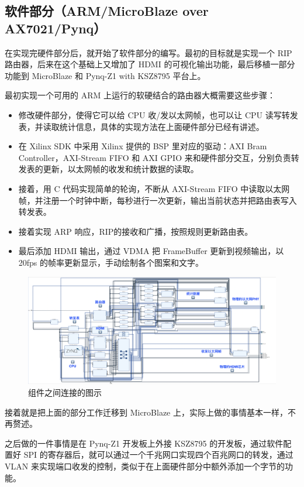 \documentclass{ctexart}
\begin{document}
\subsection{软件部分（ARM/MicroBlaze over AX7021/Pynq）}
  在实现完硬件部分后，就开始了软件部分的编写。最初的目标就是实现一个 RIP 路由器，后来在这个基础上又增加了 HDMI 的可视化输出功能，最后移植一部分功能到 MicroBlaze 和 Pynq-Z1 with KSZ8795 平台上。

  最初实现一个可用的 ARM 上运行的软硬结合的路由器大概需要这些步骤：

  \begin{itemize}
    \item 修改硬件部分，使得它可以给 CPU 收/发以太网帧，也可以让 CPU 读写转发表，并读取统计信息，具体的实现方法在上面硬件部分已经有讲述。
    \item 在 Xilinx SDK 中采用 Xilinx 提供的 BSP 里对应的驱动：AXI Bram Controller，AXI-Stream FIFO 和 AXI GPIO 来和硬件部分交互，分别负责转发表的更新，以太网帧的收发和统计数据的读取。
    \item 接着，用 C 代码实现简单的轮询，不断从 AXI-Stream FIFO 中读取以太网帧，并注册一个时钟中断，每秒进行一次更新，输出当前状态并把路由表写入转发表。
    \item 接着实现 ARP 响应，RIP的接收和广播，按照规则更新路由表。
    \item 最后添加 HDMI 输出，通过 VDMA 把 FrameBuffer 更新到视频输出，以 20fps 的帧率更新显示，手动绘制各个图案和文字。
  \end{itemize}

  \begin{figure}[htbp]
    \includegraphics[width=\linewidth]{router.png}
    \caption{组件之间连接的图示}
  \end{figure}

  接着就是把上面的部分工作迁移到 MicroBlaze 上，实际上做的事情基本一样，不再赘述。

  之后做的一件事情是在 Pynq-Z1 开发板上外接 KSZ8795 的开发板，通过软件配置好 SPI 的寄存器后，就可以通过一个千兆网口实现四个百兆网口的转发，通过 VLAN 来实现端口收发的控制，类似于在上面硬件部分中额外添加一个字节的功能。
\end{document}
